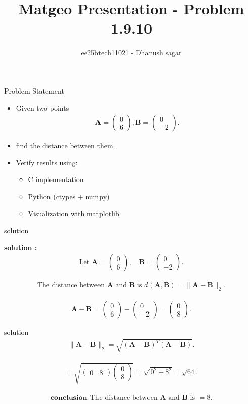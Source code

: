 \documentclass{beamer}
\title{Matgeo Presentation - Problem 1.9.10}
\author{ee25btech11021 - Dhanush sagar}
\numberwithin{equation}{section}
\theoremstyle{remark}
\newcommand{\myvec}[1]{\ensuremath{\begin{pmatrix}#1\end{pmatrix}}}
\let\vec\mathbf
\begin{document}
	

		




\begin{frame}
  \titlepage
\end{frame}

\begin{frame}{Problem Statement}
  \begin{itemize}
    \item Given two points
    \begin{align*}
    \vec{A} = \myvec{0\\6},  \vec{B} = \myvec{0\\-2}.
    \end{align*}
    \item find the  distance between them.
    \item Verify results using:
    \begin{itemize}
      \item C implementation
      \item Python (ctypes + numpy)
      \item Visualization with matplotlib
    \end{itemize}
  \end{itemize}
\end{frame}

\begin{frame}{solution}
 

\textbf{solution :}
\begin{align}
\text{Let } 
\vec{A} = \myvec{0\\6}, \quad 
\vec{B} = \myvec{0\\-2}.
\end{align}

\begin{align}
\text{The distance between } \vec{A} \text{ and } \vec{B} \text{ is }
d(\vec{A},\vec{B}) = \|\vec{A}-\vec{B}\|_2.
\end{align}

\begin{align}
\vec{A}-\vec{B} =
\myvec{0\\6} - \myvec{0\\-2} = \myvec{0\\8}.
\end{align}
\end{frame}
\begin{frame}{solution}
\begin{align}
\|\vec{A}-\vec{B}\|_2
= \sqrt{(\vec{A}-\vec{B})^T (\vec{A}-\vec{B})}.
\end{align}

\begin{align}
= \sqrt{\myvec{0 & 8}\myvec{0\\8}}
= \sqrt{0^2 + 8^2}
= \sqrt{64}.
\end{align}

\begin{align}
\textbf{conclusion} : \text{The distance between } \vec{A} \text{ and } \vec{B} \text{ is } = 8.
\end{align}
\end{frame}
\end{document}
